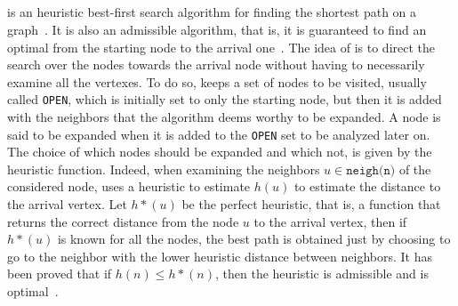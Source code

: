 \subsection{\astar}
\astar is an heuristic best-first search algorithm for finding the shortest
path on a graph~\cite{MAPF_overview}. It is also an admissible algorithm, that
is, it is guaranteed to find an optimal from the starting node to the arrival
one~\cite{astar}. \newline
The idea of \astar is to direct the search over the nodes towards the arrival
node without having to necessarily examine all the vertexes. To do so, \astar
keeps a set of nodes to be visited, usually called \texttt{OPEN}, which is
initially set to only the starting node, but then it is added with the
neighbors that the algorithm deems worthy to be expanded. A node is said to be
expanded when it is added to the \texttt{OPEN} set to be analyzed later on.
\newline
The choice of which nodes should be expanded and which not, is given by the
heuristic function. Indeed, when examining the neighbors 
$u\in \texttt{neigh(n)}$ of the considered node, \astar uses a heuristic 
to estimate $h(u)$ to estimate the distance to the arrival vertex. Let $h*(u)$
be the perfect heuristic, that is, a function that returns the correct distance
from the node $u$ to the arrival vertex, then if $h*(u)$ is known for all the
nodes, the best path is obtained just by choosing to go to the neighbor with
the lower heuristic distance between neighbors. It has been proved that if
$h(n)\leq h*(n)$, then the heuristic is admissible and \astar is
optimal~\cite{astar}.



